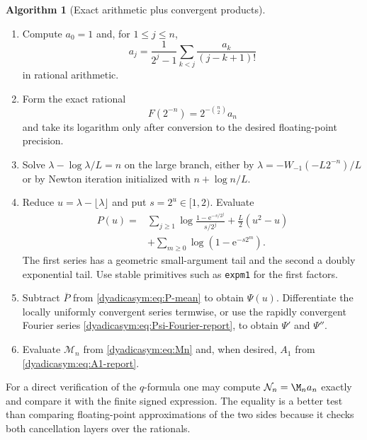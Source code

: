 \documentclass[11pt,oneside]{article}
\theoremstyle{definition}
\newtheorem{algorithm}[algorithm]{Algorithm}
\theoremstyle{remark}
\newcommand{\e}{\mathrm e}
\begin{document}
\begin{algorithm}[Exact arithmetic plus convergent products]
\label{dyadicasym:alg:numerics}
\leavevmode
\begin{enumerate}
\item Compute $a_0=1$ and, for $1\le j\le n$,
\begin{equation*}
 a_j=\frac1{2^j-1}\sum_{k<j}\frac{a_k}{(j-k+1)!}
\end{equation*}
in rational arithmetic.

\item Form the exact rational
\begin{equation*}
 F(2^{-n})=2^{-\binom n2}a_n
\end{equation*}
and take its logarithm only after conversion to the desired floating-point precision.

\item Solve $\lambda-\log\lambda/L=n$ on the large branch, either by
$\lambda=-W_{-1}(-L2^{-n})/L$ or by Newton iteration initialized with
$n+\log n/L$.

\item Reduce $u=\lambda-\lfloor\lambda\rfloor$ and put $s=2^u\in[1,2)$.  Evaluate
\begin{align*}
 P(u)={}&\sum_{j\ge1}\log\frac{1-\e^{-s/2^j}}{s/2^j}
 +\frac L2(u^2-u)\\
 &+\sum_{m\ge0}\log(1-\e^{-s2^m}).
\end{align*}
The first series has a geometric small-argument tail and the second a doubly exponential tail.
Use stable primitives such as \texttt{expm1} for the first factors.

\item Subtract $\overline P$ from \eqref{dyadicasym:eq:P-mean} to obtain $\Psi(u)$.  Differentiate the
locally uniformly convergent series termwise, or use the rapidly convergent Fourier series
\eqref{dyadicasym:eq:Psi-Fourier-report}, to obtain $\Psi'$ and $\Psi''$.

\item Evaluate $\mathcal M_n$ from \eqref{dyadicasym:eq:Mn} and, when desired, $A_1$ from
\eqref{dyadicasym:eq:A1-report}.
\end{enumerate}
\end{algorithm}

For a direct verification of the $q$-formula one may compute
$\mathcal N_n=\M_na_n$ exactly and compare it with the finite signed expression.  The equality
is a better test than comparing floating-point approximations of the two sides because it
checks both cancellation layers over the rationals.
\end{document}
